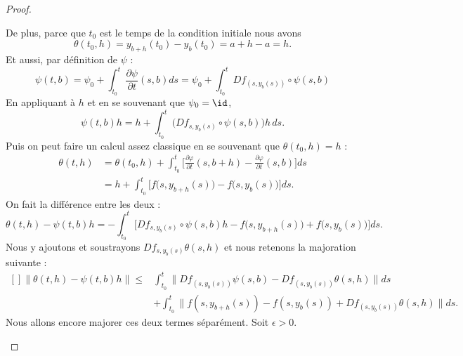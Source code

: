 \begin{proof}
\begin{subproof}
		De plus, parce que \( t_0\) est le temps de la condition initiale nous avons
		\begin{equation}
			\theta(t_0,h)=y_{b+h}(t_0)-y_{b}(t_0)=a+h-a=h.
		\end{equation}
		Et aussi, par définition de \( \psi\) :
		\begin{equation}
			\psi(t,b)=\psi_0+\int_{t_0}^t\frac{ \partial \psi }{ \partial t }(s,b)ds =\psi_0+\int_{t_0}^tDf_{(s,y_b(s))}\circ\psi(s,b)
		\end{equation}
		En appliquant à \( h\) et en se souvenant que \( \psi_0=\id\),
		\begin{equation}
			\psi(t,b)h=h+\int_{t_0}^t\Big( Df_{s,y_b(s)}\circ\psi(s,b)\Big)h\,ds.
		\end{equation}
		Puis on peut faire un calcul assez classique en se souvenant que \( \theta(t_0,h)=h\) :
		\begin{subequations}
			\begin{align}
				\theta(t,h) & =\theta(t_0,h)+\int_{t_0}^t\big[ \frac{ \partial \varphi }{ \partial t }(s,b+h)-\frac{ \partial \varphi }{ \partial t }(s,b) \big]ds \\
				            & =h+\int_{t_0}^t\big[   f\big( s,y_{b+h}(s) \big)-f\big( s,y_b(s) \big)   \big]ds.
			\end{align}
		\end{subequations}
		On fait la différence entre les deux :
		\begin{equation}
			\theta(t,h)-\psi(t,b)h=-\int_{t_0}^t\big[ Df_{s,y_b(s)}\circ\psi(s,b)h-f\big( s,y_{b+h}(s)\big)+f\big( s,y_b(s) \big) \big]ds.
		\end{equation}
		Nous y ajoutons et soustrayons \( Df_{s,y_{b}(s)}\theta(s,h)\) et nous retenons la majoration suivante :
		\begin{equation}        \label{EQooODHPooDYyBoH}
			\begin{aligned}[]
				\| \theta(t,h)-\psi(t,b)h \|\leq & \int_{t_0}^t\| Df_{(s,y_b(s))}\psi(s,b)-Df_{(s,y_b(s))} \theta(s,h)\| ds      \\
				                                 & +\int_{t_0}^t\| f(s,y_{b+h}(s))-f(s,y_b(s))+Df_{(s,y_b(s))}\theta(s,h)  \|ds.
			\end{aligned}
		\end{equation}
		Nous allons encore majorer ces deux termes séparément. Soit \( \epsilon>0\).

		\begin{subproof}



\end{subproof}
\end{subproof}
\end{proof}
